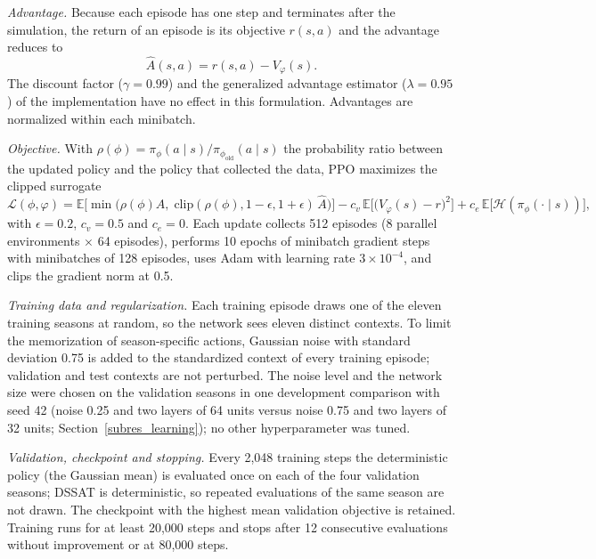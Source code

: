 \documentclass[times,final,authoryear]{elsarticle}
\begin{document}
\emph{Advantage.} Because each episode has one step and terminates after the simulation, the return of an episode is its objective $r(s,a)$ and the advantage reduces to
\begin{equation}
\hat{A}(s,a) = r(s,a) - V_\varphi(s).
\label{eq_advantage}
\end{equation}
The discount factor ($\gamma = 0.99$) and the generalized advantage estimator ($\lambda = 0.95$) of the implementation have no effect in this formulation. Advantages are normalized within each minibatch.

\emph{Objective.} With $\rho(\phi) = \pi_\phi(a \mid s)/\pi_{\phi_{\text{old}}}(a \mid s)$ the probability ratio between the updated policy and the policy that collected the data, PPO maximizes the clipped surrogate
\begin{equation}
\mathcal{L}(\phi,\varphi) = \mathbb{E}\Big[\min\big(\rho(\phi)\hat{A},\; \mathrm{clip}(\rho(\phi), 1-\epsilon, 1+\epsilon)\,\hat{A}\big)\Big] - c_v\, \mathbb{E}\Big[\big(V_\varphi(s) - r\big)^2\Big] + c_e\, \mathbb{E}\big[\mathcal{H}(\pi_\phi(\cdot \mid s))\big],
\label{eq_ppo}
\end{equation}
with $\epsilon = 0.2$, $c_v = 0.5$ and $c_e = 0$. Each update collects 512 episodes (8 parallel environments $\times$ 64 episodes), performs 10 epochs of minibatch gradient steps with minibatches of 128 episodes, uses Adam with learning rate $3\times 10^{-4}$, and clips the gradient norm at 0.5.

\emph{Training data and regularization.} Each training episode draws one of the eleven training seasons at random, so the network sees eleven distinct contexts. To limit the memorization of season-specific actions, Gaussian noise with standard deviation 0.75 is added to the standardized context of every training episode; validation and test contexts are not perturbed. The noise level and the network size were chosen on the validation seasons in one development comparison with seed 42 (noise 0.25 and two layers of 64 units versus noise 0.75 and two layers of 32 units; Section~\ref{subres_learning}); no other hyperparameter was tuned.

\emph{Validation, checkpoint and stopping.} Every 2,048 training steps the deterministic policy (the Gaussian mean) is evaluated once on each of the four validation seasons; DSSAT is deterministic, so repeated evaluations of the same season are not drawn. The checkpoint with the highest mean validation objective is retained. Training runs for at least 20,000 steps and stops after 12 consecutive evaluations without improvement or at 80,000 steps.
\end{document}
